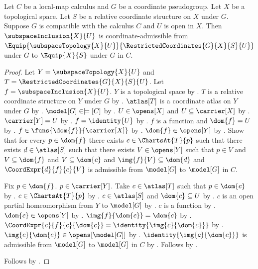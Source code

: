 \begin{theorem}\label{restricted_coordinates_inclusion}
    Let $C$ be a local-map calculus and $G$ be a coordinate pseudogroup.
    Let $X$ be a topological space.
    Let $S$ be a relative coordinate structure on $X$ under $G$.
    Suppose $G$ is compatible with the calculus $C$ and $U$ is open in $X$.
    Then $\subspaceInclusion{X}{U}$ is coordinate-admissible from
        $\Equip{\subspaceTopology{X}{U}}{\RestrictedCoordinates{G}{X}{S}{U}}$ under $G$
        to $\Equip{X}{S}$ under $G$ in $C$.
\end{theorem}
\begin{proof}
    Let $Y=\subspaceTopology{X}{U}$ and $T=\RestrictedCoordinates{G}{X}{S}{U}$.
    Let $f=\subspaceInclusion{X}{U}$.
    $Y$ is a topological space by .
    $T$ is a relative coordinate structure on $Y$ under $G$ by .
    $\atlas[T]$ is a coordinate atlas on $Y$ under $G$ by
        .
    $\model[G]\in\models[C]$ by .
    $U\in\opens[X]$ and $U\subseteq\carrier[X]$ by .
    $\carrier[Y]=U$ by .
    $f=\identity{U}$ by .
    $f$ is a function and $\dom{f}=U$ by .
    $f\in\funs{\dom{f}}{\carrier[X]}$ by .
    $\dom{f}\in\opens[Y]$ by .
    Show that for every $p\in\dom{f}$ there exists $c\in\ChartsAt{T}{p}$ such that
        there exists $d\in\atlas[S]$ such that there exists $V\in\opens[Y]$ such that
            $p\in V$ and $V\subseteq\dom{f}$ and $V\subseteq\dom{c}$ and
            $\img{f}{V}\subseteq\dom{d}$ and
            $\CoordExpr{d}{f}{c}{V}$ is admissible from $\model[G]$ to $\model[G]$ in $C$.
    \begin{subproof}
        Fix $p\in\dom{f}$.
        $p\in\carrier[Y]$.
        Take $c\in\atlas[T]$ such that $p\in\dom{c}$ by .
        $c\in\ChartsAt{T}{p}$ by .
        $c\in\atlas[S]$ and $\dom{c}\subseteq U$ by .
        $c$ is an open partial homeomorphism from $Y$ to $\model[G]$ by .
        $c$ is a function by .
        $\dom{c}\in\opens[Y]$ by .
        $\img{f}{\dom{c}}=\dom{c}$ by .
        $\CoordExpr{c}{f}{c}{\dom{c}}=\identity{\img{c}{\dom{c}}}$ by
            .
        $\img{c}{\dom{c}}\in\opens[\model[G]]$ by .
        $\identity{\img{c}{\dom{c}}}$ is admissible from $\model[G]$ to $\model[G]$ in $C$ by
            .
        Follows by .
    \end{subproof}
    Follows by .
\end{proof}
